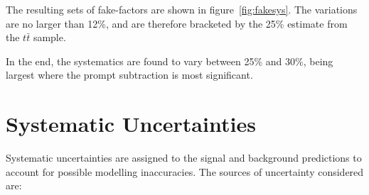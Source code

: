 The resulting sets of fake-factors are shown in figure~\ref{fig:fakesys}.  The variations
are no larger than 12\%, and are therefore bracketed by the 25\% estimate from the
$t\bar{t}$ sample.

In the end, the systematics are found to vary between 25\% and 30\%, being largest where
the prompt subtraction is most significant.





\section{Systematic Uncertainties}\label{sec:model-independent-systematics}
Systematic uncertainties are assigned to the signal and background predictions to account for possible modelling inaccuracies. The sources of uncertainty considered are:

